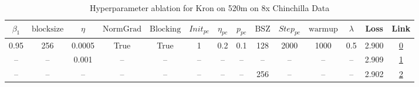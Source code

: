 \begin{table}[H]
\centering
\caption{Hyperparameter ablation for Kron on 520m on 8x Chinchilla Data}
\label{tab:ablation_kron_520m_8}
\begin{tabular}{cccccccccccccc}
\toprule
$\beta_1$ & $\mathrm{block size}$ & $\eta$ & $\mathrm{NormGrad}$ & $\mathrm{Blocking}$ & $Init_{pc}$ & $\eta_{pc}$ & $p_{pc}$ & $\mathrm{BSZ}$ & $Step_{pc}$ & $\mathrm{warmup}$ & $\lambda$ & Loss & Link \\
\midrule
0.95 & 256 & 0.0005 & True & True & 1 & 0.2 & 0.1 & 128 & 2000 & 1000 & 0.5 & 2.900 & \href{https://wandb.ai/stanford-mercury/optimizer-scaling/runs/sweep-520m-85B-kronc2a9f5lr0.0005-wd0.5-b10.95-plr0.2-pis1-gn1-n-7f654e}{0} \\
\midrule
-- & -- & 0.001 & -- & -- & -- & -- & -- & -- & -- & -- & -- & 2.909 & \href{https://wandb.ai/stanford-mercury/optimizer-scaling/runs/sweep-520m-85B-kronea1c73lr0.001-wd0.5-b10.95-plr0.2-pis1-gn1-no-82b169}{1} \\
-- & -- & -- & -- & -- & -- & -- & -- & 256 & -- & -- & -- & 2.902 & \href{https://wandb.ai/stanford-mercury/optimizer-scaling/runs/sweep-520m-85B-kronf21245lr0.0005-wd0.5-b10.95-plr0.2-pis1-gn1-n-6bceac}{2} \\
\bottomrule
\end{tabular}
\end{table}


